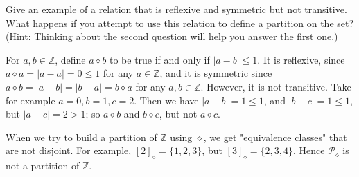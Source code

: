 \documentclass[12pt,letterpaper,boxed]{hmcpset}
\newcommand{\abs}[1]{\left|#1\right|}
\begin{document}
\begin{problem}[1.5]
	Give an example of a relation that is reflexive and symmetric but not
	transitive. What happens if you attempt to use this relation to define a
	partition on the set? (Hint: Thinking about the second question will help you
	answer the first one.)
\end{problem}

\begin{solution}
	For $a,b\in \mathbb{Z}$, define $a\diamond b$ to be true if and only if
	$\abs{a-b} \leq 1$. It is reflexive, since $a\diamond a = \abs{a-a} = 0 \leq 1$
	for any $a\in \mathbb{Z}$, and it is symmetric since $a\diamond b = \abs{a-b} =
	\abs{b-a} = b\diamond a$ for any $a,b\in \mathbb{Z}$. However, it is not
	transitive. Take for example $a=0, b=1, c=2$.  Then we have $\abs{a-b} = 1\leq
	1$, and $\abs{b-c} = 1\leq 1$, but $\abs{a-c} = 2 > 1$; so $a\diamond b$ and
	$b\diamond c$, but not $a\diamond c$.
	
	When we try to build a partition of $\mathbb{Z}$ using $\diamond$, we get
	"equivalence classes" that are not disjoint. For example, $[2]_{\diamond} =
	\{1,2,3\}$, but $[3]_{\diamond} = \{2,3,4\}$. Hence $\mathscr{P}_{\diamond}$ is
	not a partition of $\mathbb{Z}$.
\end{solution}
\end{document}
